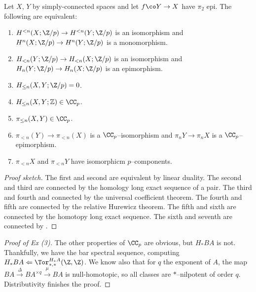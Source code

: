 \begin{theorem}[Approximation]
Let $X$, $Y$ by simply-connected spaces and let $f\co Y \to X$ have $\pi_2$ epi.  The following are equivalent:
\begin{enumerate}
    \item $H^{< n}(X; \Z/p) \to H^{< n}(Y; \Z/p)$ is an isomorphism and $H^n(X; \Z/p) \to H^n(Y; \Z/p)$ is a monomorphism.
    \item $H_{< n}(Y; \Z/p) \to H_{< n}(X; \Z/p)$ is an isomorphism and $H_n(Y; \Z/p) \to H_n(X; \Z/p)$ is an epimorphism.
    \item $H_{\le n}(X, Y; \Z/p) = 0$.
    \item $H_{\le n}(X, Y; \mathbb Z) \in \CC_p$.
    \item $\pi_{\le n}(X, Y) \in \CC_p$.
    \item $\pi_{< n}(Y) \to \pi_{< n}(X)$ is a $\CC_p$--isomorphism and $\pi_n Y \to \pi_n X$ is a $\CC_p$--epimorphism.
    \item $\pi_{< n} X$ and $\pi_{< n} Y$ have isomorphicm $p$--components.
\end{enumerate}
\end{theorem}
\begin{proof}[Proof sketch]
The first and second are equivalent by linear duality.  The second and third are connected by the homology long exact sequence of a pair.  The third and fourth and connected by the universal coefficient theorem.  The fourth and fifth are connected by the relative Hurewicz theorem.  The fifth and sixth are connected by the homotopy long exact sequence.  The sixth and seventh are connected by .
\end{proof}

\begin{proof}[Proof of Ex (3)]
The other properties of $\CC_p$ are obvious, but $H_* BA$ is not.  Thankfully, we have the bar spectral sequence, computing $H_* BA \Leftarrow \Tor^{H_* A}_{*, *}(\Z, \Z)$.  We know also that for $q$ the exponent of $A$, the map $BA \xrightarrow\Delta BA^{\times q} \xrightarrow\mu BA$ is null-homotopic, so all classes are $*$--nilpotent of order $q$.  Distributivity finishes the proof.
\end{proof}

